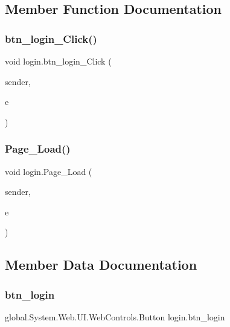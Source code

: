 \subsection{Member Function Documentation}
\mbox{\label{classlogin_a96bab638c3ffe100ae8bbaf85ca80d5e}} 
\subsubsection{\texorpdfstring{btn\_login\_Click()}{btn\_login\_Click()}}
{\footnotesize\ttfamily void login.\+btn\+\_\+login\+\_\+\+Click (\begin{DoxyParamCaption}\item[{object}]{sender,  }\item[{Event\+Args}]{e }\end{DoxyParamCaption})\hspace{0.3cm}{\ttfamily [protected]}}

\mbox{\label{classlogin_a30ed18159e2ef11720b7447ad4a9cb28}} 
\subsubsection{\texorpdfstring{Page\_Load()}{Page\_Load()}}
{\footnotesize\ttfamily void login.\+Page\+\_\+\+Load (\begin{DoxyParamCaption}\item[{object}]{sender,  }\item[{Event\+Args}]{e }\end{DoxyParamCaption})\hspace{0.3cm}{\ttfamily [protected]}}



\subsection{Member Data Documentation}
\mbox{\label{classlogin_aa77bd8617de6dd15c10a444e406e2c98}} 
\subsubsection{\texorpdfstring{btn\_login}{btn\_login}}
{\footnotesize\ttfamily global.\+System.\+Web.\+U\+I.\+Web\+Controls.\+Button login.\+btn\+\_\+login\hspace{0.3cm}{\ttfamily [protected]}}



